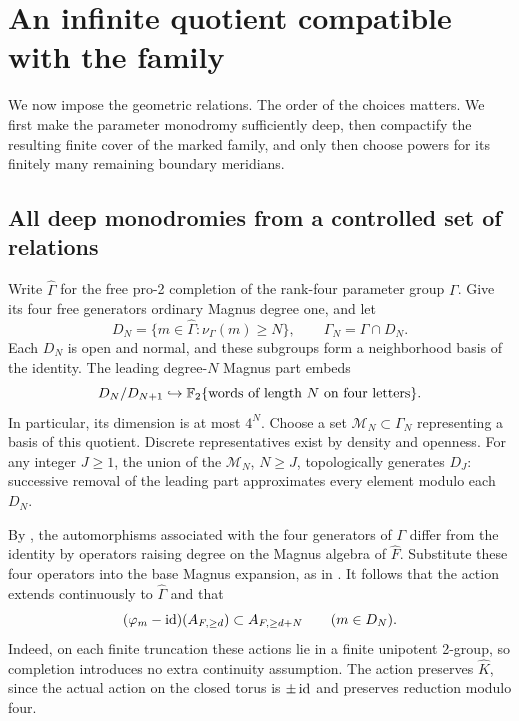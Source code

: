 \section{An infinite quotient compatible with the family}
\label{sec:quotient}

We now impose the geometric relations. The order of the choices matters. We first make the parameter monodromy sufficiently deep, then compactify the resulting finite cover of the marked family, and only then choose powers for its finitely many remaining boundary meridians.

\subsection{All deep monodromies from a controlled set of relations}

Write $\widehat\Gamma$ for the free pro-2 completion of the rank-four parameter group $\Gamma$. Give its four free generators ordinary Magnus degree one, and let
\[
 D_N=\{m\in\widehat\Gamma:\nu_\Gamma(m)\ge N\},
 \qquad \Gamma_N=\Gamma\cap D_N.
\]
Each $D_N$ is open and normal, and these subgroups form a neighborhood basis of the identity. The leading degree-$N$ Magnus part embeds
\[
 D_N/D_{N+1}\hookrightarrow
 \mathbb F_2\{\text{words of length }N\text{ on four letters}\}.
\]
In particular, its dimension is at most $4^N$. Choose a set $\mathcal M_N\subset\Gamma_N$ representing a basis of this quotient. Discrete representatives exist by density and openness. For any integer $J\ge1$, the union of the $\mathcal M_N$, $N\ge J$, topologically generates $D_J$: successive removal of the leading part approximates every element modulo each $D_N$.

By , the automorphisms associated with the four generators of $\Gamma$ differ from the identity by operators raising degree on the Magnus algebra of $\widehat F$. Substitute these four operators into the base Magnus expansion, as in . It follows that the action extends continuously to $\widehat\Gamma$ and that
\begin{equation}\label{eq:deep-action}
 (\varphi_m-\operatorname{id})(A_{F,\ge d})\subset A_{F,\ge d+N}
 \qquad(m\in D_N).
\end{equation}
Indeed, on each finite truncation these actions lie in a finite unipotent 2-group, so completion introduces no extra continuity assumption. The action preserves $\widehat K$, since the actual action on the closed torus is $\pm\operatorname{id}$ and preserves reduction modulo four.

